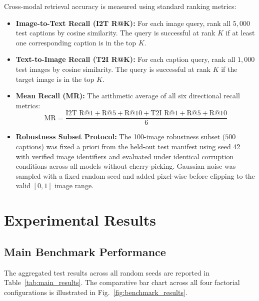 \documentclass[pdflatex,sn-mathphys-num]{sn-jnl}%
\begin{document}
Cross-modal retrieval accuracy is measured using standard ranking metrics:
\begin{itemize}
    \item \textbf{Image-to-Text Recall (I2T R@K):} For each image query, rank all $5{,}000$ test captions by cosine similarity. The query is successful at rank $K$ if at least one corresponding caption is in the top $K$.
    \item \textbf{Text-to-Image Recall (T2I R@K):} For each caption query, rank all $1{,}000$ test images by cosine similarity. The query is successful at rank $K$ if the target image is in the top $K$.
    \item \textbf{Mean Recall (MR):} The arithmetic average of all six directional recall metrics:
    \begin{equation}
    \text{MR} = \frac{\text{I2T R@1} + \text{R@5} + \text{R@10} + \text{T2I R@1} + \text{R@5} + \text{R@10}}{6}
    \end{equation}
    \item \textbf{Robustness Subset Protocol:} The 100-image robustness subset ($500$ captions) was fixed a priori from the held-out test manifest using seed 42 with verified image identifiers and evaluated under identical corruption conditions across all models without cherry-picking. Gaussian noise was sampled with a fixed random seed and added pixel-wise before clipping to the valid $[0, 1]$ image range.
\end{itemize}

\section{Experimental Results}
\label{sec:results}

\subsection{Main Benchmark Performance}
The aggregated test results across all random seeds are reported in Table~\ref{tab:main_results}. The comparative bar chart across all four factorial configurations is illustrated in Fig.~\ref{fig:benchmark_results}.
\end{document}
